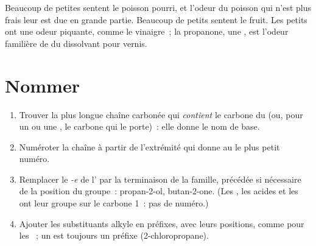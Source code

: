 \begin{remark}\label{rem:g11:functional-groups:smells}
Beaucoup de petites  sentent le poisson pourri, et l'odeur du
poisson qui n'est plus frais leur est due en grande partie. Beaucoup de
petits  sentent le fruit. Les petits  ont une
odeur piquante, comme le vinaigre~; la propanone, une , est
l'odeur familière de  du dissolvant pour vernis.
\end{remark}

\section{Nommer}

\begin{method}\label{met:g11:functional-groups:naming}
\begin{enumerate}
  \item Trouver la plus longue chaîne carbonée qui \emph{contient} le
        carbone du  (ou, pour un  ou une
        , le carbone qui le porte)~: elle donne le nom de base.
  \item Numéroter la chaîne à partir de l'extrémité qui donne au  le plus petit numéro.
  \item Remplacer le \emph{-e} de l' par la terminaison de la
        famille, précédée si nécessaire de la position du groupe~:
        propan-2-ol, butan-2-one. (Les , les acides et les
         ont leur groupe sur le carbone 1~: pas de numéro.)
  \item Ajouter les substituants alkyle en préfixes, avec leurs
        positions, comme pour les ~; un  est toujours un
        préfixe (2-chloropropane).
\end{enumerate}
\end{method}


